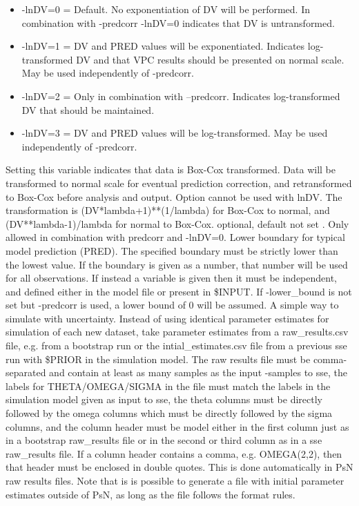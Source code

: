 \begin{optionlist}
\begin{itemize}
	\item -lnDV=0   =	Default. No exponentiation of DV will be performed. In combination with -predcorr -lnDV=0 indicates that DV is untransformed.
	\item -lnDV=1   =	DV and PRED values will be exponentiated. Indicates log-transformed DV and that VPC results should be presented on normal scale. May be used independently of -predcorr.
	\item -lnDV=2   =	Only in combination with –predcorr. Indicates log-transformed DV that should be maintained.
	\item -lnDV=3  =  DV and PRED values will be log-transformed. May be used independently of \mbox{-predcorr}.
\end{itemize}
\nextopt
{}
Setting this variable indicates that data is Box-Cox transformed. Data will be transformed to normal scale for eventual prediction correction, and retransformed to Box-Cox before analysis and output. Option cannot be used with lnDV. The transformation is (DV*lambda+1)**(1/lambda) for Box-Cox to normal, and (DV**lambda-1)/lambda for normal to Box-Cox. 
\nextopt
{}
optional, default not set . Only allowed in combination with predcorr and -lnDV=0. Lower boundary for typical model prediction (PRED). The specified boundary must be strictly lower than the lowest value. If the boundary is given as a number, that number will be used for all observations. If  instead a variable is given then it must be independent, and defined either in the model file or present in \$INPUT.  If -lower\_bound is not set but -predcorr is used, a lower bound of 0 will be assumed. 
\nextopt
{}
A simple way to simulate with uncertainty. Instead of using identical parameter estimates for simulation of each new dataset, take parameter estimates from a raw\_results.csv file, e.g. from a bootstrap run or the intial\_estimates.csv file from a previous sse run with \$PRIOR in the simulation model. The raw results file must be comma-separated and contain at least as many samples as the input -samples to sse, the labels for  THETA/OMEGA/SIGMA in the file must match the labels in the simulation model given as input to sse, the theta columns must be directly followed by the omega columns which must be directly followed by the sigma columns, and the column header must be model either in the first column just as in a bootstrap raw\_results file or in the second or third column as in a sse raw\_results file. If a column header contains a comma, e.g. OMEGA(2,2), then that header must be enclosed in double quotes. This is done automatically in PsN raw results files. Note that is is possible to generate a file with initial parameter estimates outside of PsN, as long as the file follows the format rules. 

\end{optionlist}
